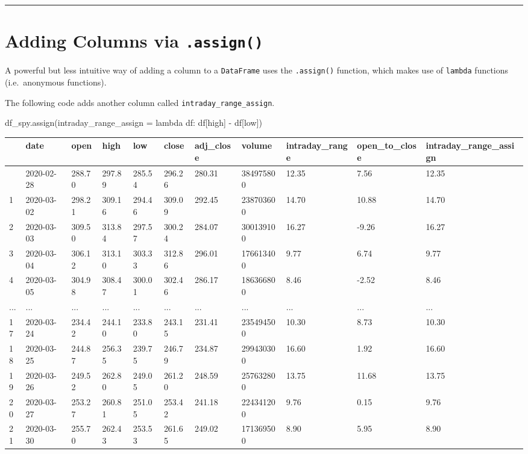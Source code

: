 \documentclass[
  letterpaper,
  DIV=11,
  numbers=noendperiod]{scrreprt}
\newenvironment{Shaded}{\begin{snugshade}}{\end{snugshade}}
\newcommand{\KeywordTok}[1]{\textcolor[rgb]{0.00,0.23,0.31}{#1}}
\newcommand{\NormalTok}[1]{\textcolor[rgb]{0.00,0.23,0.31}{#1}}
\newcommand{\OperatorTok}[1]{\textcolor[rgb]{0.37,0.37,0.37}{#1}}
\newcommand{\StringTok}[1]{\textcolor[rgb]{0.13,0.47,0.30}{#1}}
\begin{document}
\begin{center}\rule{0.5\linewidth}{0.5pt}\end{center}

\hypertarget{adding-columns-via-.assign}{%
\section{\texorpdfstring{Adding Columns via
\texttt{.assign()}}{Adding Columns via .assign()}}\label{adding-columns-via-.assign}}

A powerful but less intuitive way of adding a column to a
\texttt{DataFrame} uses the \texttt{.assign()} function, which makes use
of \texttt{lambda} functions (i.e.~anonymous functions).

The following code adds another column called
\texttt{intraday\_range\_assign}.

\begin{Shaded}
\begin{Highlighting}[]
\NormalTok{df\_spy.assign(intraday\_range\_assign }\OperatorTok{=} \KeywordTok{lambda}\NormalTok{ df: df[}\StringTok{\textquotesingle{}high\textquotesingle{}}\NormalTok{] }\OperatorTok{{-}}\NormalTok{ df[}\StringTok{\textquotesingle{}low\textquotesingle{}}\NormalTok{])}
\end{Highlighting}
\end{Shaded}

\begin{longtable}[]{@{}lllllllllll@{}}
\toprule\noalign{}
& date & open & high & low & close & adj\_close & volume &
intraday\_range & open\_to\_close & intraday\_range\_assign \\
\midrule\noalign{}
\endhead
\bottomrule\noalign{}
\endlastfoot
0 & 2020-02-28 & 288.70 & 297.89 & 285.54 & 296.26 & 280.31 & 384975800
& 12.35 & 7.56 & 12.35 \\
1 & 2020-03-02 & 298.21 & 309.16 & 294.46 & 309.09 & 292.45 & 238703600
& 14.70 & 10.88 & 14.70 \\
2 & 2020-03-03 & 309.50 & 313.84 & 297.57 & 300.24 & 284.07 & 300139100
& 16.27 & -9.26 & 16.27 \\
3 & 2020-03-04 & 306.12 & 313.10 & 303.33 & 312.86 & 296.01 & 176613400
& 9.77 & 6.74 & 9.77 \\
4 & 2020-03-05 & 304.98 & 308.47 & 300.01 & 302.46 & 286.17 & 186366800
& 8.46 & -2.52 & 8.46 \\
... & ... & ... & ... & ... & ... & ... & ... & ... & ... & ... \\
17 & 2020-03-24 & 234.42 & 244.10 & 233.80 & 243.15 & 231.41 & 235494500
& 10.30 & 8.73 & 10.30 \\
18 & 2020-03-25 & 244.87 & 256.35 & 239.75 & 246.79 & 234.87 & 299430300
& 16.60 & 1.92 & 16.60 \\
19 & 2020-03-26 & 249.52 & 262.80 & 249.05 & 261.20 & 248.59 & 257632800
& 13.75 & 11.68 & 13.75 \\
20 & 2020-03-27 & 253.27 & 260.81 & 251.05 & 253.42 & 241.18 & 224341200
& 9.76 & 0.15 & 9.76 \\
21 & 2020-03-30 & 255.70 & 262.43 & 253.53 & 261.65 & 249.02 & 171369500
& 8.90 & 5.95 & 8.90 \\
\end{longtable}
\end{document}
